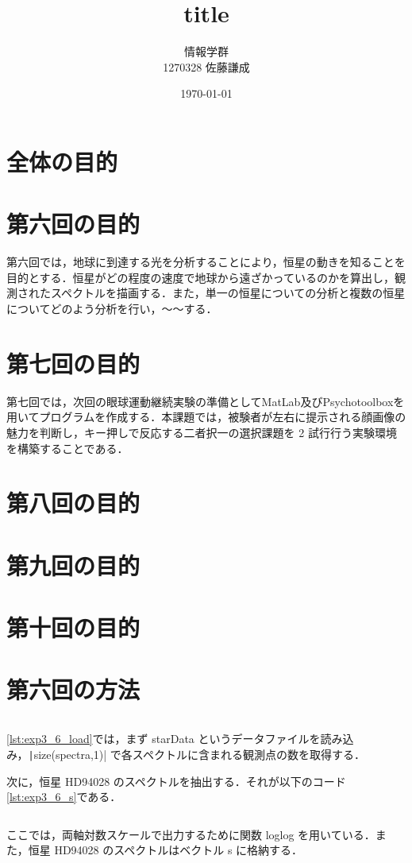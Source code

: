 \documentclass[dvipdfmx, titlepage]{jsarticle}
\title{title}
\author{情報学群 \\ 1270328 佐藤謙成}
\date{\today}
\begin{document}
\maketitle

\begin{abstract}
    
\end{abstract}
\section{全体の目的}
\section{第六回の目的}
    第六回では，地球に到達する光を分析することにより，恒星の動きを知ることを目的とする．恒星がどの程度の速度で地球から遠ざかっているのかを算出し，観測されたスペクトルを描画する．また，単一の恒星についての分析と複数の恒星についてどのよう分析を行い，～～する．
\section{第七回の目的}
    第七回では，次回の眼球運動継続実験の準備としてMatLab及びPsychotoolboxを用いてプログラムを作成する．本課題では，被験者が左右に提示される顔画像の魅力を判断し，キー押しで反応する二者択一の選択課題を 2 試行行う実験環境を構築することである．
\section{第八回の目的}
\section{第九回の目的}
\section{第十回の目的}

\section{第六回の方法}
    \inputminted[linenos, firstline=1, lastline=2, frame=lines, fontsize=\small]{matlab}{code/Exp3_6_Matlab.m}
    \ref{lst:exp3_6_load}では，まず starData というデータファイルを読み込み，\texttt|size(spectra,1)| で各スペクトルに含まれる観測点の数を取得する．

    次に，恒星 HD94028 のスペクトルを抽出する．それが以下のコード \ref{lst:exp3_6_s}である．
    \inputminted[linenos, firstline=14, lastline=19, frame=lines, fontsize=\small]{matlab}{code/Exp3_6_Matlab.m}
    ここでは，両軸対数スケールで出力するために関数 loglog を用いている．また，恒星 HD94028 のスペクトルはベクトル s に格納する．
\end{document}
